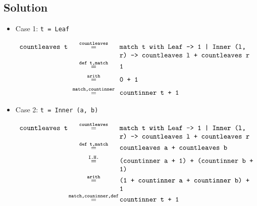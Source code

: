 \subsection*{Solution}

\begin{itemize}
    \item {
        Case 1: \texttt{t = Leaf}

        \begin{displaymath}
            \begin{aligned}
                \texttt{countleaves t}
                &\eq{countleaves}{match t with Leaf  -> 1 | Inner (l, r) -> countleaves l + countleaves r} \\
                &\eq{def t,match}{1} \\
                &\eq{arith}{0 + 1} \\
                &\eq{match,countinner}{countinner t + 1} 
            \end{aligned}
        \end{displaymath}
    }
    \item {
        Case 2: \texttt{t = Inner (a, b)}

        \begin{displaymath}
            \begin{aligned}
                \texttt{countleaves t}
                &\eq{countleaves}{match t with Leaf  -> 1 | Inner (l, r) -> countleaves l + countleaves r} \\
                &\eq{def t,match}{countleaves a + countleaves b} \\
                &\eq{I.H.}{(countinner a + 1) + (countinner b + 1)} \\
                &\eq{arith}{(1 + countinner a + countinner b) + 1} \\
                &\eq{match,couninner,def}{countinner t + 1}
            \end{aligned}
        \end{displaymath}
    }
\end{itemize}
